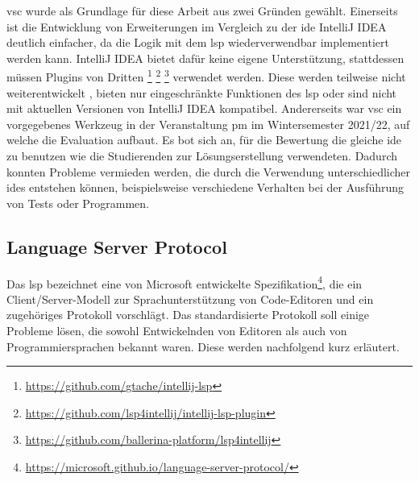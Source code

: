 \ac{vsc} wurde als Grundlage für diese Arbeit aus zwei Gründen gewählt.
Einerseits ist die Entwicklung von Erweiterungen im Vergleich zu der \ac{ide} IntelliJ IDEA deutlich einfacher, da die Logik mit dem \ac{lsp} wiederverwendbar implementiert werden kann.
IntelliJ IDEA bietet dafür keine eigene Unterstützung, stattdessen müssen Plugins von Dritten
\footnote{\url{https://github.com/gtache/intellij-lsp}\label{fn:intellij-lsp}}
\footnote{\url{https://github.com/lsp4intellij/intellij-lsp-plugin}\label{fn:intellij-lsp-plugin}}
\footnote{\url{https://github.com/ballerina-platform/lsp4intellij}\label{fn:lsp4intellij}}
verwendet werden.
Diese werden teilweise nicht weiterentwickelt , bieten nur eingeschränkte Funktionen des \ac{lsp} oder sind nicht mit aktuellen Versionen von IntelliJ IDEA kompatibel.
Andererseits war \ac{vsc} ein vorgegebenes Werkzeug in der Veranstaltung \ac{pm} im Wintersemester 2021/22, auf welche die Evaluation aufbaut.
Es bot sich an, für die Bewertung die gleiche \ac{ide} zu benutzen wie die Studierenden zur Lösungserstellung verwendeten.
Dadurch konnten Probleme vermieden werden, die durch die Verwendung unterschiedlicher \acp{ide} entstehen können, beispielsweise verschiedene Verhalten bei der Ausführung von Tests oder Programmen.

\subsection{Language Server Protocol}\label{subsec:language-server-protocol}

Das \ac{lsp} bezeichnet eine von Microsoft entwickelte Spezifikation\footnote{\url{https://microsoft.github.io/language-server-protocol/}}, die ein Client/Server-Modell zur Sprachunterstützung von Code-Editoren und ein zugehöriges Protokoll vorschlägt.
Das standardisierte Protokoll soll einige Probleme lösen, die sowohl Entwickelnden von Editoren als auch von Programmiersprachen bekannt waren.
Diese werden nachfolgend kurz erläutert.

